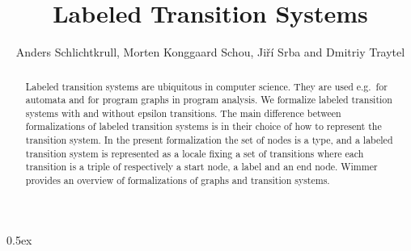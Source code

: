 \documentclass[10pt,a4paper]{article}
\begin{document}
\title{Labeled Transition Systems}
\author{Anders Schlichtkrull, Morten Konggaard Schou, Ji\v{r}\'i Srba and Dmitriy Traytel}
\date{}

\maketitle

\begin{abstract}
\noindent
Labeled transition systems are ubiquitous in computer science. They are used e.g.\ for automata and for program graphs in program analysis.
We formalize labeled transition systems with and without epsilon transitions.
The main difference between formalizations of labeled transition systems is in their choice of how to represent the transition system.
In the present formalization the set of nodes is a type, and a labeled transition system is represented as a locale fixing a set 
of transitions where each transition is a triple of respectively a start node, a label and an end node.
Wimmer~\cite{graphs} provides an overview of formalizations of graphs and transition systems.

\end{abstract}

\tableofcontents

\newpage

\parindent 0pt
\parskip 0.5ex

\newpage





\end{document}

